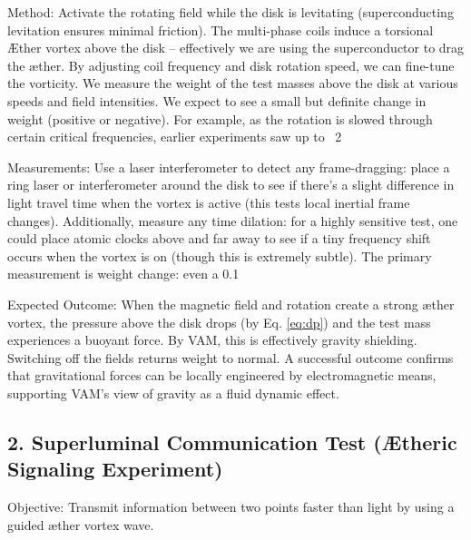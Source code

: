 Method: Activate the rotating field while the disk is levitating (superconducting levitation ensures minimal friction). The multi-phase coils induce a torsional Æther vortex above the disk – effectively we are using the superconductor to drag the æther. By adjusting coil frequency and disk rotation speed, we can fine-tune the vorticity. We measure the weight of the test masses above the disk at various speeds and field intensities. We expect to see a small but definite change in weight (positive or negative). For example, as the rotation is slowed through certain critical frequencies, earlier experiments saw up to ~2%


Measurements: Use a laser interferometer to detect any frame-dragging: place a ring laser or interferometer around the disk to see if there's a slight difference in light travel time when the vortex is active (this tests local inertial frame changes). Additionally, measure any time dilation: for a highly sensitive test, one could place atomic clocks above and far away to see if a tiny frequency shift occurs when the vortex is on (though this is extremely subtle). The primary measurement is weight change: even a 0.1%


Expected Outcome: When the magnetic field and rotation create a strong æther vortex, the pressure above the disk drops (by Eq. \eqref{eq:dp}) and the test mass experiences a buoyant force. By VAM, this is effectively gravity shielding. Switching off the fields returns weight to normal. A successful outcome confirms that gravitational forces can be locally engineered by electromagnetic means, supporting VAM's view of gravity as a fluid dynamic effect.


\subsection*{2. Superluminal Communication Test (Ætheric Signaling Experiment)}

Objective: Transmit information between two points faster than light by using a guided æther vortex wave.


